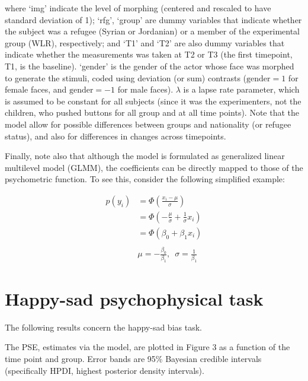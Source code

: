 \documentclass[]{article}
\begin{document}
where `img' indicate the level of morphing (centered and rescaled to
have standard deviation of 1); `rfg', `group' are dummy variables that
indicate whether the subject was a refugee (Syrian or Jordanian) or a
member of the experimental group (WLR), respectively; and `T1' and `T2'
are also dummy variables that indicate whether the measurements was
taken at T2 or T3 (the first timepoint, T1, is the baseline). `gender'
is the gender of the actor whose face was morphed to generate the
stimuli, coded using deviation (or sum) contrasts (\(\text{gender}=1\)
for female faces, and \(\text{gender}=-1\) for male faces). \(\lambda\)
is a lapse rate parameter, which is assumed to be constant for all
subjects (since it was the experimenters, not the children, who pushed
buttons for all group and at all time points). Note that the model allow
for possible differences between groups and nationality (or refugee
status), and also for differences in changes across timepoints.

Finally, note also that although the model is formulated as generalized
linear multilevel model (GLMM), the coefficients can be directly mapped
to those of the psychometric function. To see this, consider the
following simplified example:

\begin{align*}
p \left(y_i\right) & = \Phi\left(\frac{x_i -\mu}{\sigma} \right) \\
& = \Phi ( -\frac{\mu}{\sigma} + \frac{1}{\sigma}x_i )\\
& = \Phi\left(\beta_0 + \beta_1x_i \right) \\ \\& \mu=-\frac{\beta_0}{\beta_1}, \,\,\, \sigma=\frac{1}{\beta_1}
\end{align*}

\hypertarget{happy-sad-psychophysical-task}{%
\section{Happy-sad psychophysical
task}\label{happy-sad-psychophysical-task}}

The following results concern the happy-sad bias task.

The PSE, estimates via the model, are plotted in Figure 3 as a function
of the time point and group. Error bands are 95\% Bayesian credible
intervals (specifically HPDI, highest posterior density intervals).
\end{document}
